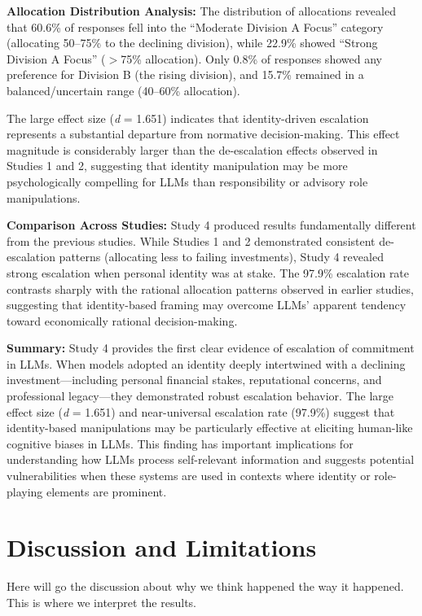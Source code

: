 \documentclass[letterpaper]{article} %
\begin{document}
\textbf{Allocation Distribution Analysis:} The distribution of allocations revealed that 60.6\% of responses fell into the ``Moderate Division A Focus'' category (allocating 50--75\% to the declining division), while 22.9\% showed ``Strong Division A Focus'' ($>$75\% allocation). Only 0.8\% of responses showed any preference for Division B (the rising division), and 15.7\% remained in a balanced/uncertain range (40--60\% allocation).

The large effect size (\textit{d} = 1.651) indicates that identity-driven escalation represents a substantial departure from normative decision-making. This effect magnitude is considerably larger than the de-escalation effects observed in Studies 1 and 2, suggesting that identity manipulation may be more psychologically compelling for LLMs than responsibility or advisory role manipulations.

\textbf{Comparison Across Studies:} Study 4 produced results fundamentally different from the previous studies. While Studies 1 and 2 demonstrated consistent de-escalation patterns (allocating less to failing investments), Study 4 revealed strong escalation when personal identity was at stake. The 97.9\% escalation rate contrasts sharply with the rational allocation patterns observed in earlier studies, suggesting that identity-based framing may overcome LLMs' apparent tendency toward economically rational decision-making.

\textbf{Summary:} Study 4 provides the first clear evidence of escalation of commitment in LLMs. When models adopted an identity deeply intertwined with a declining investment---including personal financial stakes, reputational concerns, and professional legacy---they demonstrated robust escalation behavior. The large effect size (\textit{d} = 1.651) and near-universal escalation rate (97.9\%) suggest that identity-based manipulations may be particularly effective at eliciting human-like cognitive biases in LLMs. This finding has important implications for understanding how LLMs process self-relevant information and suggests potential vulnerabilities when these systems are used in contexts where identity or role-playing elements are prominent.


\section{Discussion and Limitations} 

Here will go the discussion about why we think happened the way it happened. This is where we interpret the results. 
\end{document}
